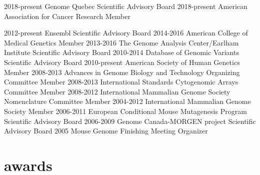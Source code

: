 \documentclass[]{dmc-cv} %
\begin{document}
\begin{entrylist}
\smallentry
{2018-present}
{Genome Quebec}
{Scientific Advisory Board}
\smallentry
{2018-present}
{American Association for Cancer Research}
{Member}

\smallentry
{2012-present}
{Ensembl}
{Scientific Advisory Board}
\smallentry
{2014-2016}
{American College of Medical Genetics}
{Member}
\smallentry
{2013-2016}
{The Genome Analysis Center/Earlham Institute}
{Scientific Advisory Board}
\smallentry
{2010-2014}
{Database of Genomic Variants}
{Scientific Advisory Board}
\smallentry
{2010-present}
{American Society of Human Genetics}
{Member}
\smallentry
{2008-2013}
{Advances in Genome Biology and Technology}
{Organizing Committee Member}
\smallentry
{2008-2013}
{International Standards Cytogenomic Arrays}
{Committee Member}
\smallentry
{2008-2012}
{International Mammalian Genome Society}
{Nomenclature Committee Member}
\smallentry
{2004-2012}
{International Mammalian Genome Society}
{Member}
\smallentry
{2006-2011}
{European Conditional Mouse Mutagenesis Program}
{Scientific Advisory Board}
\smallentry
{2006-2009}
{Genome Canada-MORGEN project}
{Scientific Advisory Board}
\smallentry
{2005}
{Mouse Genome Finishing Meeting}
{Organizer}
\end{entrylist}


\section{awards}
\end{document}

